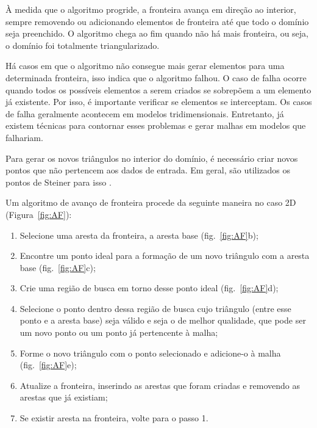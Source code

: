 À medida que o algoritmo progride, a fronteira avança em direção ao interior, sempre removendo ou adicionando elementos de fronteira até que todo o domínio seja preenchido. O algoritmo chega ao fim quando não há mais fronteira, ou seja, o domínio foi totalmente triangularizado. 

Há casos em que o algoritmo não consegue mais gerar elementos para uma determinada fronteira, isso indica que o algoritmo falhou. O caso de falha ocorre quando todos os possíveis elementos a serem criados se sobrepõem a um elemento já existente. Por isso, é importante verificar se elementos se interceptam. Os casos de falha geralmente acontecem em modelos tridimensionais. Entretanto, já existem técnicas para contornar esses problemas e gerar malhas em modelos que falhariam.

Para gerar os novos triângulos no interior do domínio, é necessário criar novos pontos que não pertencem aos dados de entrada. Em geral, são utilizados os pontos de Steiner para isso \cite{bib:Ruppert99}.

Um algoritmo de avanço de fronteira procede da seguinte maneira no caso 2D (Figura~\ref{fig:AF}):
 
 \begin{enumerate}
\item{ Selecione uma aresta da fronteira, a aresta base (fig.~\ref{fig:AF}b);}
\item{ Encontre um ponto ideal para a formação de um novo triângulo com a aresta base (fig.~\ref{fig:AF}c);}
\item{ Crie uma região de busca em torno desse ponto ideal (fig.~\ref{fig:AF}d);}
\item{ Selecione o ponto dentro dessa região de busca cujo triângulo (entre esse ponto e a aresta base) seja válido e seja o de melhor qualidade, que pode ser um novo ponto ou um ponto já pertencente à malha;}
\item{ Forme o novo triângulo com o ponto selecionado e adicione-o à malha (fig.~\ref{fig:AF}e);}
\item{ Atualize a fronteira, inserindo as arestas que foram criadas e removendo as arestas que já existiam;}
\item{ Se existir aresta na fronteira, volte para o passo 1.}
\end{enumerate}

